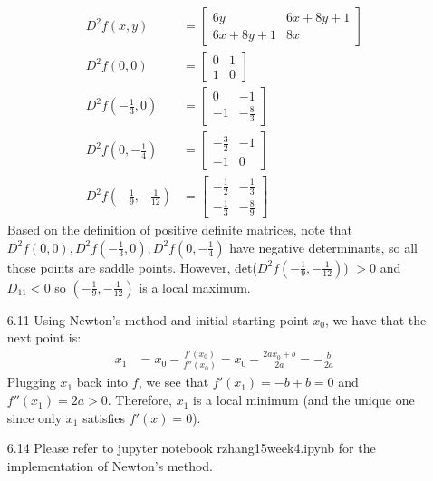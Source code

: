 \documentclass[letterpaper,12pt]{article}
\theoremstyle{definition}
\begin{document}
\begin{enumerate}
    \begin{align*}
      D^2f(x,y) &=
      \begin{bmatrix}
        6y & 6x+8y+1 \\
        6x+8y+1 & 8x
      \end{bmatrix} \\
      D^2f(0,0) &=
      \begin{bmatrix}
        0 & 1 \\
        1 & 0
      \end{bmatrix} \\
      D^2f(-\frac{1}{3},0) &=
      \begin{bmatrix}
        0 & -1 \\
        -1 & -\frac{8}{3}
      \end{bmatrix} \\
      D^2f(0,-\frac{1}{4}) &=
      \begin{bmatrix}
        -\frac{3}{2} & -1 \\
        -1 & 0
      \end{bmatrix} \\
      D^2f(-\frac{1}{9},-\frac{1}{12}) &=
      \begin{bmatrix}
        -\frac{1}{2} & -\frac{1}{3} \\
        -\frac{1}{3} & -\frac{8}{9}
      \end{bmatrix}
    \end{align*}
    Based on the definition of positive definite matrices, note that $D^2f(0,0), D^2f(-\frac{1}{3},0), D^2f(0,-\frac{1}{4})$ have negative determinants, so all those points are saddle points. However, det($D^2f(-\frac{1}{9},-\frac{1}{12})$) $> 0$ and $D_{11} < 0$ so $(-\frac{1}{9},-\frac{1}{12})$ is a local maximum.
  \item[6.11]
    Using Newton's method and initial starting point $x_0$, we have that the next point is:
    \begin{align*}
      x_1 &= x_0 - \frac{f'(x_0)}{f''(x_0)} = x_0 - \frac{2ax_0+b}{2a} = -\frac{b}{2a}
    \end{align*}
    Plugging $x_1$ back into $f$, we see that $f'(x_1) = -b+b = 0$ and $f''(x_1) = 2a > 0$. Therefore, $x_1$ is a local minimum (and the unique one since only $x_1$ satisfies $f'(x)=0$).
  \item[6.14]
    Please refer to jupyter notebook rzhang15\textunderscore week4.ipynb for the implementation of Newton's method.

\end{enumerate}
\end{document}
